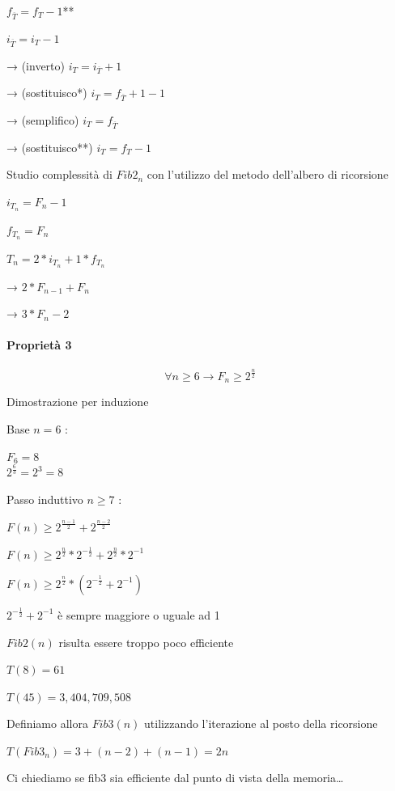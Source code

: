 \documentclass{article}
\let\oldparagraph\paragraph
\renewcommand{\paragraph}[1]{\oldparagraph{#1}\mbox{}}
\begin{document}
{{{$f_{\overline{T}} = f_{T}-1${**}

$i_{\overline{T}} = i_{T}-1$

{→ (inverto) $i_T=i_{\overline{T}}+1$}

{→ (sostituisco*) $i_T=f_{\overline{T}}+1-1$}

{→ (semplifico) $i_T=f_{\overline{T}}$}

{→ (sostituisco**) $i_T=f_T-1$}

{Studio complessità di $Fib2_n$ con l'utilizzo del metodo dell'albero di ricorsione}

$i_{T_n}=F_n-1$

$f_{T_n}=F_n$

$T_n = 2 * i_{T_n}+1*f_{T_n}$

{→ $2 * F_{n-1} + F_n$}

{→ $3 * F_n - 2$}

\paragraph{Proprietà 3}

\begin{equation}
\forall n \geq 6 \rightarrow F_n \geq 2^{\frac{n}{2}}
\end{equation}

{Dimostrazione per induzione}

{Base $n=6$ :}

$F_6=8$	\\
$2^{\frac{6}{3}}=2^3=8$

{Passo induttivo $n \geq 7$ :}

$F(n) \geq 2^{\frac{n-1}{2}} + 2^{\frac{n-2}{2}}$

$F(n) \geq 2^{\frac{n}{2}} * 2^{-\frac{1}{2}} + 2^{\frac{n}{2}} * 2^{-1} $

$F(n) \geq 2^{\frac{n}{2}} * ( 2^{-\frac{1}{2}} + 2^{-1} )$

{$2^{-\frac{1}{2}}+2^{-1}$ è sempre maggiore o uguale ad 1}

{$Fib2(n)$ risulta essere troppo poco efficiente}

$T(8)=61$

$T(45) = 3,404,709,508$

{Definiamo allora $Fib3(n)$ utilizzando l'iterazione al posto della ricorsione}



$T(Fib3_n)=3+(n-2)+(n-1)=2n$

{Ci chiediamo se fib3 sia efficiente dal punto di vista della
memoria\ldots{}}

}}}
\end{document}
